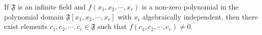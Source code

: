 If $\mathfrak{F}$ is an infinite field and $f(x_1, x_2, \cdots, x_r)$ is a non-zero polynomial in the polynomial domain $\mathfrak{F}[x_1, x_2, \cdots, x_r]$ with $x_i$ algebraically independent, then there exist elements $c_1, c_2, \cdots, c_r \in \mathfrak{F}$ such that $f(c_1, c_2, \cdots, c_r) \neq 0$.
